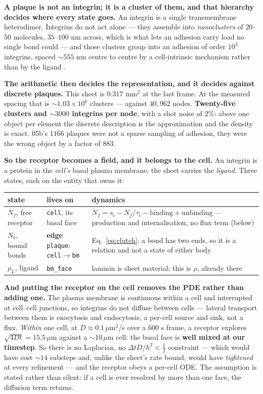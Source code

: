\documentclass[10pt,a4paper]{article}
\newcommand{\code}[1]{\texttt{#1}}
\begin{document}
\textbf{A plaque is not an integrin; it is a cluster of them, and that hierarchy decides where every
state goes.} An integrin is a single transmembrane heterodimer. Integrins do not act alone --- they
assemble into \emph{nanoclusters} of $20$--$50$ molecules, $35$--$100$ nm across, which is what lets an
adhesion carry load no single bond could \cite{changede2017} --- and those clusters group into an
adhesion of order $10^3$ integrins, spaced $\sim\!555$ nm centre to centre by a cell-intrinsic
mechanism rather than by the ligand \cite{nanoclusters2025}.

\textbf{The arithmetic then decides the representation, and it decides against discrete plaques.} This
sheet is $0.317$ mm$^2$ at the last frame. At the measured spacing that is $\sim\!1.03\times10^6$
clusters --- against $40{,}962$ nodes. \textbf{Twenty-five clusters and $\sim\!3000$ integrins per
node}, with a shot noise of $2\%$: above one object per element the discrete description is the
approximation and the density is exact. 05b's $1166$ plaques were not a sparse sampling of adhesion,
they were the wrong object by a factor of $883$.

\textbf{So the receptor becomes a field, and it belongs to the cell.} An integrin is a protein in the
\emph{cell's} basal plasma membrane; the sheet carries the \emph{ligand}. Three states, each on the
entity that owns it:

\smallskip
{\footnotesize
\begin{tabularx}{\textwidth}{@{}llL@{}}\toprule
state & lives on & dynamics\\\midrule
$N_f$, free receptor & \code{cell}, its basal face & $\dot N_f=s_i-N_f/\tau_i-\text{binding}
  +\text{unbinding}$ --- production and internalisation, no flux term (below)\\
$N_b$, bound bonds & \textbf{edge} \code{plaque}: \code{cell}$\to$\code{bm} & Eq.~\eqref{eq:clutch}:
  a bond has two ends, so it is a relation and not a state of either body\\
$\rho_L$, ligand & \code{bm\_face} & laminin is sheet material; this is $\rho$, already there\\
\bottomrule
\end{tabularx}}
\smallskip

\textbf{And putting the receptor on the cell removes the PDE rather than adding one.} The plasma
membrane is continuous within a cell and interrupted at cell--cell junctions, so integrins do not
diffuse between cells --- lateral transport between them is exocytosis and endocytosis, a per-cell
source and sink, not a flux. \emph{Within} one cell, at $D\approx0.1\,\mu$m$^2$/s over a $600$ s frame,
a receptor explores $\sqrt{4Dt}=15.5\,\mu$m against a $\sim\!10\,\mu$m cell: the basal face is
\textbf{well mixed at our timestep}. So there is no Laplacian, no $\Delta t D/h^2<\tfrac12$ constraint
--- which would have cost $\sim\!14$ substeps and, unlike the sheet's rate bound, would have
\emph{tightened} at every refinement --- and the receptor obeys a per-cell ODE. The assumption is
stated rather than silent: if a cell is ever resolved by more than one face, the diffusion term returns.
\end{document}
